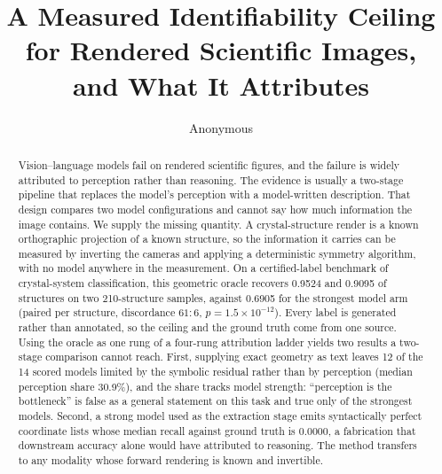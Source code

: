 \documentclass{article}
\title{A Measured Identifiability Ceiling for Rendered Scientific Images,\\
and What It Attributes}
\author{Anonymous}
\begin{document}
\maketitle

\begin{abstract}
Vision--language models fail on rendered scientific figures, and the failure is widely attributed to
perception rather than reasoning. The evidence is usually a two-stage pipeline that replaces the model's
perception with a model-written description. That design compares two model configurations and cannot say
how much information the image contains. We supply the missing quantity. A crystal-structure render is a
known orthographic projection of a known structure, so the information it carries can be measured by
inverting the cameras and applying a deterministic symmetry algorithm, with no model anywhere in the
measurement. On a certified-label benchmark of crystal-system classification, this geometric oracle
recovers 0.9524 and 0.9095 of structures on two 210-structure samples, against 0.6905 for the strongest
model arm (paired per structure, discordance $61{:}6$, $p = 1.5\times10^{-12}$). Every label is generated rather than annotated,
so the ceiling and the ground truth come from one source. Using the oracle as one rung of a four-rung
attribution ladder yields two results a two-stage comparison cannot reach. First, supplying exact geometry
as text leaves 12 of the 14 scored models limited by the symbolic residual rather than by perception
(median perception share 30.9\%), and the share tracks model strength: ``perception is the bottleneck'' is
false as a general statement on this task and true only of the strongest models. Second, a strong model
used as the extraction stage emits syntactically perfect coordinate lists whose median recall against
ground truth is 0.0000, a fabrication that downstream accuracy alone would have attributed to reasoning.
The method transfers to any modality whose forward rendering is known and invertible.
\end{abstract}













\appendix

\end{document}
